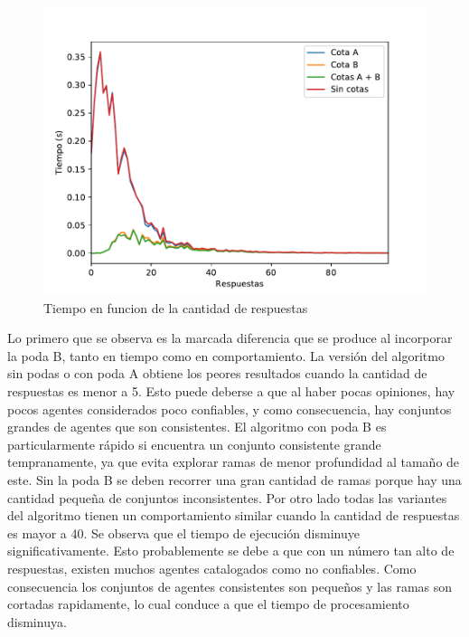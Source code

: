 \documentclass{article}
\begin{document}
\begin{figure}[h]
\caption{Tiempo en funcion de la cantidad de respuestas}
\centering
\includegraphics[scale=0.5]{Respuestas_st.pdf}
\end{figure}

Lo primero que se observa es la marcada diferencia que se produce al incorporar la poda B, tanto en tiempo como en comportamiento. La versión del algoritmo sin podas o con poda A obtiene los peores resultados cuando la cantidad de respuestas es menor a 5. Esto puede deberse a que al haber pocas opiniones, hay pocos agentes considerados poco confiables, y como consecuencia, hay conjuntos grandes de agentes que son consistentes. El algoritmo con poda B es particularmente rápido si encuentra un conjunto consistente grande tempranamente, ya que evita explorar ramas de menor profundidad al tamaño de este. Sin la poda B se deben recorrer una gran cantidad de ramas porque hay una cantidad pequeña de conjuntos inconsistentes. Por otro lado todas las variantes del algoritmo tienen un comportamiento similar cuando la cantidad de respuestas es mayor a 40. Se observa que el tiempo de ejecución disminuye significativamente. Esto probablemente se debe a que con un número tan alto de respuestas, existen muchos agentes catalogados como no confiables. Como consecuencia los conjuntos de agentes consistentes son pequeños y las ramas son cortadas rapidamente, lo cual conduce a que el tiempo de procesamiento disminuya. \\


\end{document}
